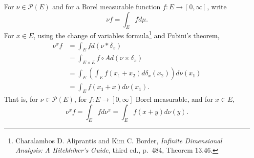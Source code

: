 \documentclass{article}
\theoremstyle{definition}
\begin{document}
For $\nu \in \mathscr{P}(E)$ and for 
a Borel measurable function $f:E \to [0,\infty]$, write
\[
\nu f = \int_E f d\mu.
\]
For $x \in E$, using the change of variables formula\footnote{Charalambos D. Aliprantis
and Kim C. Border, {\em Infinite Dimensional Analysis: A Hitchhiker's Guide}, third ed., p.~484, Theorem 13.46.}
and Fubini's theorem,
\begin{align*}
\nu^x f &= \int_E f d(\nu*\delta_x)\\
&=\int_{E \times E} f \circ A d(\nu \times \delta_x)\\
&=\int_E \left(\int_E f(x_1+x_2) d\delta_x(x_2) \right) d\nu(x_1)\\
&=\int_E f(x_1+x) d\nu(x_1).
\end{align*}
That is, for $\nu \in \mathscr{P}(E)$, for $f:E \to [0,\infty]$ Borel measurable, and for $x \in E$,
\begin{equation}
\nu^x f = \int_E f d\nu^x = \int_E f(x+y) d\nu(y).
\label{shift}
\end{equation}
\end{document}

